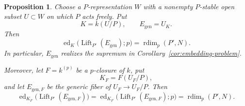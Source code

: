 \documentclass[11pt,reqno]{amsart}
\numberwithin{equation}{section}
\theoremstyle{plain}
\newtheorem{prop}{Proposition}[section]
\theoremstyle{definition}
\def\rdim{{\operatorname{rdim}}}
\def\ed{{\operatorname{ed}}}
\begin{document}
\begin{prop}
\label{pro:generic-embedding-problem}
Choose a $P$-representation $W$ with a nonempty $P$-stable open subset
$U\subset W$ on which $P$ acts freely.  Put
\[
K=k(U/P),
\qquad
E_{\mathrm{gen}}=U_K.
\]
Then
\begin{equation}\label{eq:generic-embedding-attainment}
\ed_K\bigl(\operatorname{Lift}_{P'}(E_{\mathrm{gen}});p\bigr)
=\rdim_p(P',N).
\end{equation}
In particular, $E_{\mathrm{gen}}$ realizes the supremum in
Corollary~\ref{cor:embedding-problem}.

Moreover, let $F=k^{(p)}$ be a $p$-closure of $k$, put
\[
K_F=F(U_F/P),
\]
and let $E_{\mathrm{gen},F}$ be the generic fiber of
$U_F\to U_F/P$.  Then
\begin{equation}\label{eq:generic-embedding-attainment-pclosure}
\ed_{K_F}\bigl(\operatorname{Lift}_{P'}(E_{\mathrm{gen},F})\bigr)
=
\ed_{K_F}\bigl(\operatorname{Lift}_{P'}(E_{\mathrm{gen},F});p\bigr)
=
\rdim_p(P',N).
\end{equation}
\end{prop}
\end{document}
